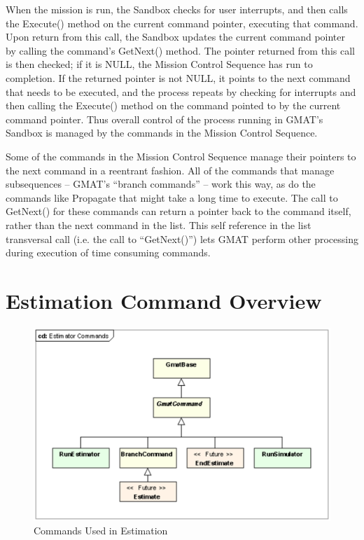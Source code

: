 When the mission is run, the Sandbox checks for user interrupts, and then calls the Execute() method
on the current command pointer, executing that command.  Upon return from this call, the Sandbox
updates the current command pointer by calling the command's GetNext() method.  The pointer returned
from this call is then checked; if it is NULL, the Mission Control Sequence has run to completion.
If the returned pointer is not NULL, it points to the next command that needs to be executed, and
the process repeats by checking for interrupts and then calling the Execute() method on the command
pointed to by the current command pointer.  Thus overall control of the process running in GMAT's
Sandbox is managed by the commands in the Mission Control Sequence.

Some of the commands in the Mission Control Sequence manage their pointers to the next command in a reentrant fashion.  All of the commands that manage subsequences -- GMAT's ``branch commands'' -- work this way, as do the commands like Propagate that might take a long time to execute.  The call to GetNext() for these commands can return a pointer back to the command itself, rather than the next command in the list.  This self reference in the list transversal call (i.e. the call to ``GetNext()'') lets GMAT perform other processing during execution of time consuming commands.

\section{Estimation Command Overview}

\begin{figure}[htbp]
\begin{center}
\includegraphics[scale=0.6]{Images/EstimatorCommands.eps}
\caption{\label{fig:EstimatorCommands}Commands Used in Estimation}
\end{center}
\end{figure}


